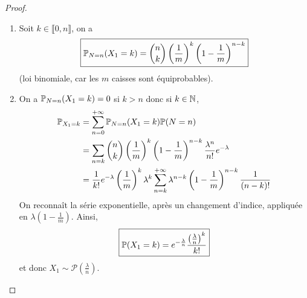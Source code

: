 \begin{proof}
    \phantom{}
    \begin{enumerate}
        \item Soit $k\in\llbracket0,n\rrbracket$, on a 
        \begin{equation}
            \boxed{\P_{N=n}(X_{1}=k)=\binom{n}{k}\left(\frac{1}{m}\right)^{k}\left(1-\frac{1}{m}\right)^{n-k}}
        \end{equation}
        (loi binomiale, car les $m$ caisses sont équiprobables).

        \item On a $\P_{N=n}(X_{1}=k)=0$ si $k>n$ donc si $k\in\N$,
        \begin{align}
            \P_{X_{1}=k}
            &=\sum_{n=0}^{+\infty}\P_{N=n}(X_{1}=k)\P(N=n)\\
            &=\sum_{n=k}\binom{n}{k}\left(\frac{1}{m}\right)^{k}\left(1-\frac{1}{m}\right)^{n-k}\frac{\lambda^{n}}{n!}e^{-\lambda}\\
            &=\frac{1}{k!}e^{-\lambda}\left(\frac{1}{m}\right)^{k}\lambda^{k}\sum_{n=k}^{+\infty}\lambda^{n-k}\left(1-\frac{1}{m}\right)^{n-k}\frac{1}{(n-k)!}
        \end{align}
        On reconnaît la série exponentielle, après un changement d'indice, appliquée en $\lambda\left(1-\frac{1}{m}\right)$. Ainsi,
        \begin{equation}
            \boxed{\P(X_{1}=k)=e^{-\frac{\lambda}{n}}\frac{\left(\frac{\lambda}{n}\right)^{k}}{k!}}
        \end{equation}
        et donc $X_{1}\sim\mathcal{P}\left(\frac{\lambda}{n}\right)$.
    \end{enumerate}
\end{proof}

